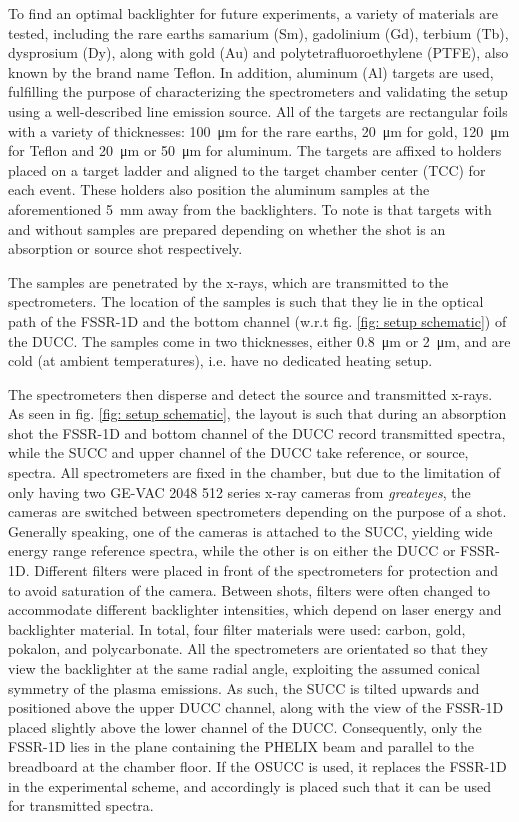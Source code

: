 To find an optimal backlighter for 
future experiments, a variety of materials are tested, including the rare 
earths samarium (Sm), gadolinium (Gd), terbium (Tb), dysprosium (Dy), along 
with gold (Au) and polytetrafluoroethylene (PTFE), also known by the brand name Teflon. In 
addition, aluminum (Al) targets are used, 
fulfilling the purpose of characterizing the spectrometers and validating the 
setup using a well-described line emission source. All of the targets are 
rectangular foils with a variety of thicknesses: \SI{100}{\micro\meter} for the 
rare earths, \SI{20}{\micro\meter} for gold, \SI{120}{\micro\meter} for Teflon and \SI{20}{\micro\meter} or 
\SI{50}{\micro\meter} for aluminum. The targets are affixed to holders placed 
on a target ladder and aligned to the target chamber center (TCC) for 
each event. These holders also position the aluminum samples at the 
aforementioned \SI{5}{\milli\meter} away from the backlighters. To note is that targets with and without samples are prepared depending on whether the shot is an absorption or source shot respectively.

The samples are penetrated by the x-rays, which are transmitted to the 
spectrometers. The location of the samples is such that they lie in the optical 
path of the FSSR-1D and the bottom channel (w.r.t fig. \ref{fig: setup 
schematic}) of the DUCC. The samples come in two thicknesses, either
\SI{0.8}{\micro\meter} or \SI{2}{\micro\meter}, and are cold (at ambient temperatures), i.e. have no dedicated heating setup.

The spectrometers then disperse and detect the source and transmitted x-rays. As seen in fig. \ref{fig: setup schematic}, the layout is such that 
during an absorption shot the FSSR-1D and bottom channel of 
the DUCC record transmitted spectra, while the SUCC and upper channel of 
the DUCC take reference, or source, spectra. All spectrometers are fixed in the chamber, but due to the limitation of only 
having two GE-VAC 2048 512 series x-ray cameras from \textit{greateyes}, the cameras are switched between spectrometers depending on the purpose of a shot. Generally speaking, one of the cameras is 
attached to the SUCC, yielding wide energy range reference spectra, while the 
other is on either the DUCC or FSSR-1D. Different filters were placed in front of the spectrometers for protection and to avoid saturation of the camera. Between shots, filters were often 
changed to accommodate different backlighter intensities, which depend on laser 
energy and backlighter material. In total, four filter materials were used: 
carbon, gold, pokalon, and polycarbonate. All the spectrometers are orientated so that they view the 
backlighter at the same radial angle, exploiting the assumed conical symmetry 
of the plasma emissions. As such, the SUCC is tilted upwards and positioned 
above the upper DUCC channel, along with the view of the FSSR-1D placed 
slightly above the lower channel of the DUCC. Consequently, only the FSSR-1D 
lies in the plane containing the PHELIX beam and parallel to the breadboard at the chamber floor. If the OSUCC is used, it replaces the FSSR-1D in the experimental scheme, and accordingly is placed such that it can be used for transmitted spectra.

